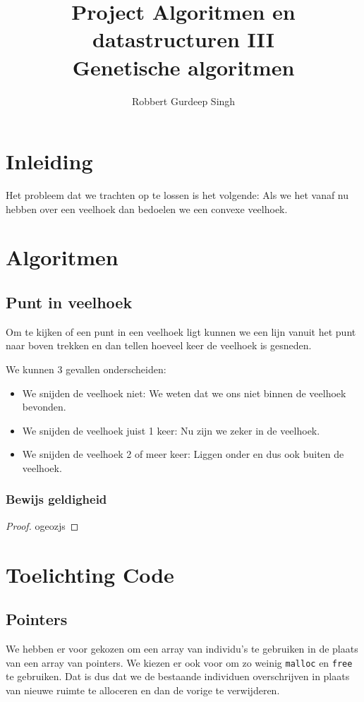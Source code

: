 \documentclass[11pt,a4paper]{article}
\author{Robbert Gurdeep Singh}
\title{{Project Algoritmen en datastructuren III}\\ \Huge Genetische algoritmen}
\date{}
\begin{document}
\twocolumn[\begin{@twocolumnfalse}
    \maketitle
\end{@twocolumnfalse}]


\section{Inleiding}
\label{sec:inleiding}
Het probleem dat we trachten op te lossen is het volgende: %
Als we het vanaf nu hebben over een veelhoek dan bedoelen we een convexe veelhoek.


\section{Algoritmen}
\label{sec:algoritmen}

\subsection{Punt in veelhoek}
\label{sub:algo-pt-in-poly}
Om te kijken of een punt in een veelhoek ligt kunnen we een lijn vanuit het punt naar boven 
trekken en dan tellen hoeveel keer de veelhoek is gesneden.

We kunnen 3 gevallen onderscheiden:
\begin{itemize}
\item We snijden de veelhoek niet: We weten dat we ons niet binnen de veelhoek bevonden.
\item We snijden de veelhoek juist 1 keer: Nu zijn we zeker in de veelhoek. 
\item We snijden de veelhoek 2 of meer keer: Liggen onder en dus ook buiten de veelhoek.
\end{itemize}

\subsubsection{Bewijs geldigheid}
\begin{proof}
ogeozjs
\end{proof}



\section{Toelichting Code}
\label{sec:explainationcode}
\subsection{Pointers}
\label{sub:pointer}
We hebben er voor gekozen om een array van individu's te gebruiken in de plaats van een array van pointers. We kiezen er ook voor om zo weinig \texttt{malloc} en \texttt{free} te gebruiken. Dat is dus dat we de bestaande individuen overschrijven in plaats van nieuwe ruimte te alloceren en dan de vorige te verwijderen.
\end{document}

